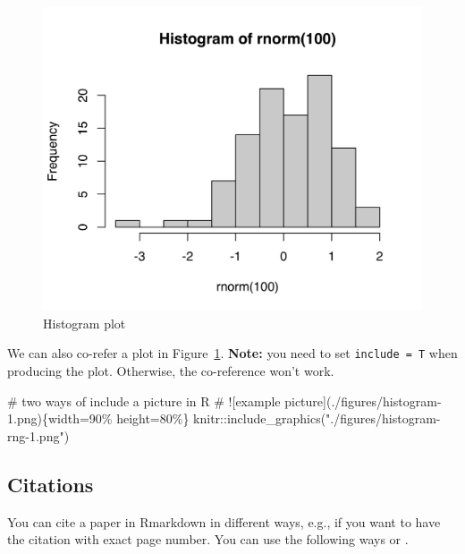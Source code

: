\documentclass[
	letterpaper,
	DIV=11,
	numbers=noendperiod]{scrartcl}
\newenvironment{Shaded}{\begin{snugshade}}{\end{snugshade}}
\newcommand{\CommentTok}[1]{\textcolor[rgb]{0.37,0.37,0.37}{#1}}
\newcommand{\FunctionTok}[1]{\textcolor[rgb]{0.28,0.35,0.67}{#1}}
\newcommand{\NormalTok}[1]{\textcolor[rgb]{0.00,0.23,0.31}{#1}}
\newcommand{\SpecialCharTok}[1]{\textcolor[rgb]{0.37,0.37,0.37}{#1}}
\newcommand{\StringTok}[1]{\textcolor[rgb]{0.13,0.47,0.30}{#1}}
\begin{document}
\begin{figure}

	{\centering \includegraphics{figures/fig-histogram-rng-1.png}

	}

	\caption{\label{fig-histogram-rng}Histogram plot}

\end{figure}

We can also co-refer a plot in Figure~\ref{fig-histogram-rng}.
\textbf{Note:} you need to set \texttt{include\ =\ T} when producing the
plot. Otherwise, the co-reference won't work.

\begin{Shaded}
	\begin{Highlighting}[]
		\CommentTok{\# two ways of include a picture in R}
		\CommentTok{\# ![example picture](./figures/histogram{-}1.png)\{width=90\% height=80\%\}}
		\NormalTok{knitr}\SpecialCharTok{::}\FunctionTok{include\_graphics}\NormalTok{(}\StringTok{"./figures/histogram{-}rng{-}1.png"}\NormalTok{)}
	\end{Highlighting}
\end{Shaded}

\hypertarget{citations}{%
	\subsection{Citations}\label{citations}}

You can cite a paper in Rmarkdown in different ways, e.g., if you want
to have the citation with exact page number. You can use the following
ways \autocite[see][p.45]{Jing2022} or \textcite[pp.~404]{Jing2022}.
\end{document}
